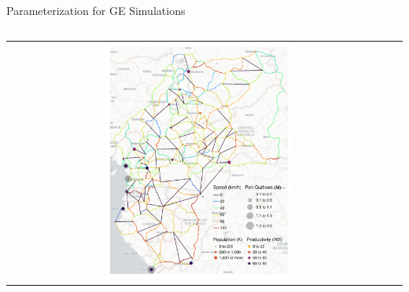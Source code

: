 \documentclass[aspectratio=169,xcolor=dvipsnames]{beamer}
\begin{document}
\begin{frame}{Parameterization for GE Simulations}
\begin{adjustbox}{center}
\begin{columns}
\begin{column}{0.8\textwidth}
{\begin{tabular}{@{}c@{}c@{}}
\includegraphics[width=0.5\textwidth, trim= {9mm 0 9mm 0}, clip]{"../figures/trans_CEMAC_network_GE_parameterization_latest_google.pdf"}
\end{tabular}
}
        \end{column}
    \end{columns}
  \end{adjustbox}
\end{frame}
\end{document}
